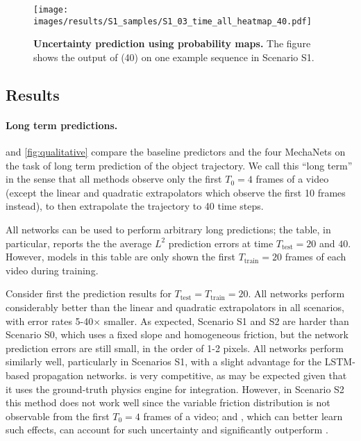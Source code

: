 


\begin{figure*}[t!]
\texttt{[image: images/results/S1\_samples/S1\_03\_time\_all\_heatmap\_40.pdf]}
\caption{\textbf{Uncertainty prediction using probability maps.} The figure shows the output of \NetFour (40) on one example sequence in Scenario S1.}\label{fig:heat}
\end{figure*}

\subsection{Results}\label{sec:quant_eval}

\paragraph{Long term predictions.}  and \cref{fig:qualitative} compare the baseline predictors and the four MechaNets on the task of long term prediction of the object trajectory. We call this ``long term'' in the sense that all methods observe only the first $T_0=4$ frames of a video (except the linear and quadratic extrapolators which observe the first 10 frames instead), to then extrapolate the trajectory to 40 time steps.

All networks can be used to perform arbitrary long predictions; the table, in particular, reports the the average $L^2$ prediction errors at time $T_\text{test}=20$ and $40$. However, models in this table are only shown the first $T_\text{train}=20$ frames of each video during training.

Consider first the prediction results for $T_\text{test}=T_\text{train}=20$. All networks perform considerably better than the linear and quadratic extrapolators in all scenarios, with error rates 5-40$\times$ smaller. As expected, Scenario S1 and S2 are harder than Scenario S0, which uses a fixed slope and homogeneous friction, but the network prediction errors are still small, in the order of 1-2 pixels. All networks perform similarly well, particularly in Scenarios S1, with a slight advantage for the LSTM-based propagation networks. \mbox{\SimNet} is very competitive, as may be expected given that it uses the ground-truth physics engine for integration. However, in Scenario S2 this method does not work well since the variable friction distribution is not observable from the first $T_0=4$ frames of a video;  \NetTwo and \NetFour, which can better learn such effects, can account for such uncertainty and significantly outperform \SimNet.

